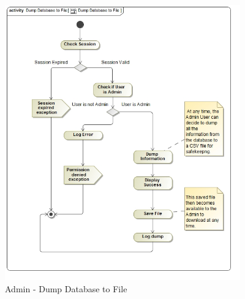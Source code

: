 \documentclass{article}
\begin{document}
			\begin{figure}[H]
				\includegraphics[width=4in, center]{../Diagrams/Process Specifications/Reporting subsystem/Dump Database to File.jpg}
				\caption{Admin - Dump Database to File}
			\end{figure}
			
\end{document}
